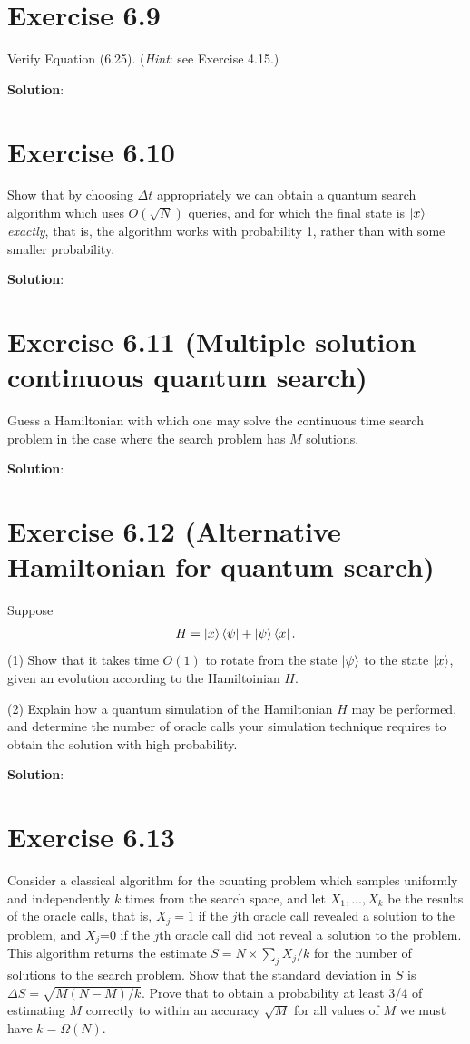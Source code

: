 \documentclass{book}
\begin{document}
    \section*{Exercise 6.9}
        Verify Equation (6.25). (\emph{Hint}: see Exercise 4.15.)
        
        \textbf{Solution}:
    
    \section*{Exercise 6.10}
        Show that by choosing $\Delta t$ appropriately we can obtain a quantum
        search algorithm which uses $O(\sqrt{N})$ queries, and for which the final state is $\ket{x}$ \emph{exactly}, that is, the algorithm works with probability 1, rather than with some smaller probability.
        
        \textbf{Solution}:
    
    \section*{Exercise 6.11 (Multiple solution continuous quantum search)}
        Guess a Hamiltonian with which one may solve the continuous time search problem in the case where the search problem has $M$ solutions.
        
        \textbf{Solution}:
    
    \section*{Exercise 6.12 (Alternative Hamiltonian for quantum search)}
        Suppose
        \begin{align}
            H = \ket{x}\bra{\psi}+\ket{\psi}\bra{x}.
        \end{align}
        (1) Show that it takes time $O(1)$ to rotate from the state $\ket{\psi}$ to the state $\ket{x}$, given an evolution according to the Hamiltoinian $H$. \par
        (2) Explain how a quantum simulation of the Hamiltonian $H$ may be performed, and determine the number of oracle calls your simulation technique requires to obtain the solution with high probability.
        
        \textbf{Solution}:
    
    \section*{Exercise 6.13}
        Consider a classical algorithm for the counting problem which samples uniformly and independently $k$ times from the search space, and let $X_1, ..., X_k$ be the results of the oracle calls, that is, $X_j = 1$ if the $j$th oracle call revealed a solution to the problem, and $X_j$=0 if the $j$th oracle call did not reveal a solution to the problem. This algorithm returns the estimate $S = N\times \sum_j X_j/k$ for the number of solutions to the search problem. Show that the standard deviation in $S$ is $\Delta S = \sqrt{M(N-M)/k}$. Prove that to obtain a probability at least 3/4 of estimating $M$ correctly to within an accuracy $\sqrt{M}$ for all values of $M$ we must have $k = \Omega(N)$.
        
\end{document}
